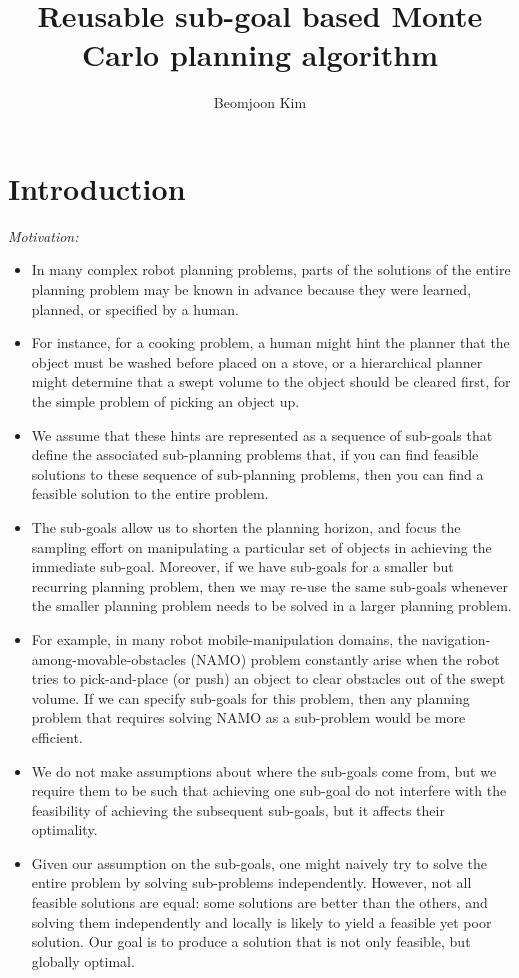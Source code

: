 \documentclass[10pt,letterpaper]{article}
\author{Beomjoon Kim}
\title{Reusable sub-goal based Monte Carlo planning algorithm}
\begin{document}
\maketitle
\section{Introduction}
\emph{Motivation:}
\begin{itemize}
\item In many complex robot planning problems,
parts of the solutions of the entire planning problem may be known in advance 
because they were learned, planned, or specified by a human.
\item For instance, for a cooking problem, a human might hint the planner that the object must be
washed before placed on a stove, or a hierarchical planner might determine that
a swept volume to the object should be cleared first, for the simple problem of
picking an object up.
\item We assume that these hints are represented as a sequence of 
sub-goals that define the associated sub-planning problems that, 
if you can find feasible solutions
to these sequence of sub-planning problems, then you can find a feasible solution
to the entire problem.
\item The sub-goals allow us to shorten the planning horizon, and 
focus the sampling effort on manipulating a particular set of objects
in achieving the immediate sub-goal. Moreover, if we have sub-goals for
a smaller but recurring planning problem, then we may re-use the same
sub-goals whenever the smaller planning problem needs to be solved in a
larger planning problem.
\item For example, in many robot mobile-manipulation domains, 
the navigation-among-movable-obstacles (NAMO)
problem constantly arise when the robot tries to pick-and-place (or push) an object
to clear obstacles out of the swept volume. If we can specify sub-goals for
this problem, then any planning problem that requires solving NAMO as a sub-problem
would be more efficient.
\item We do not make assumptions about where the sub-goals come from, but we require
them to be such that achieving one sub-goal do not interfere with the feasibility of
 achieving the subsequent sub-goals, but it affects their optimality.
\item Given our assumption on the sub-goals, one might naively 
try to solve the entire problem by solving
sub-problems independently. However, not all feasible solutions 
are equal: some solutions are better than the others, and solving
them independently and locally is likely to yield a feasible yet poor solution.
Our goal is to produce a solution that is not only feasible, but globally
optimal.
\end{itemize}
\end{document}
